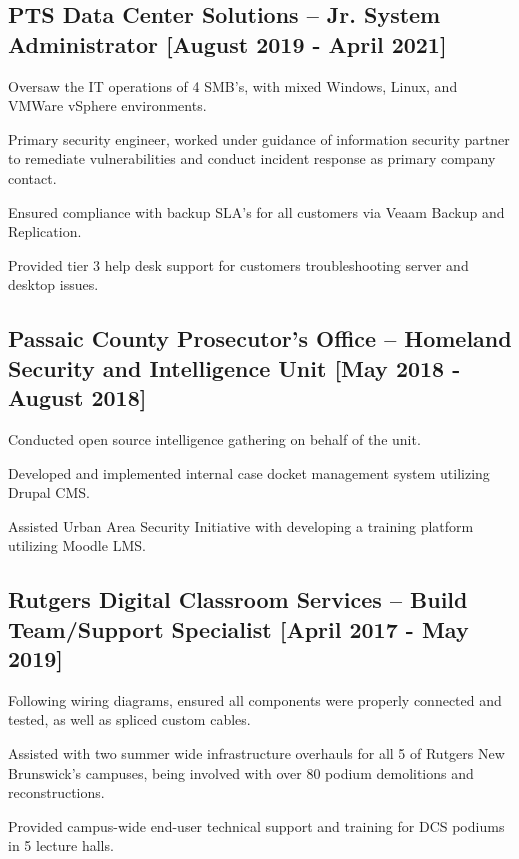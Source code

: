 \documentclass{article}
\begin{document}
\begin{samepage}
\subsection{PTS Data Center Solutions -- Jr. System Administrator [August 2019 - April 2021]}
\begin{compactitem}
	\item Oversaw the IT operations of 4 SMB's, with mixed Windows, Linux, and VMWare vSphere environments.
	\item Primary security engineer, worked under guidance of information security partner to remediate vulnerabilities and conduct incident response as primary company contact.
	\item Ensured compliance with backup SLA's for all customers via Veaam Backup and Replication.
	\item Provided tier 3 help desk support for customers troubleshooting server and desktop issues.
\end{compactitem}
\subsection{Passaic County Prosecutor's Office -- Homeland Security and Intelligence Unit [May 2018 - August 2018]}
\begin{compactitem}
	\item Conducted open source intelligence gathering on behalf of the unit.
	\item Developed and implemented internal case docket management system utilizing Drupal CMS.
	\item Assisted Urban Area Security Initiative with developing a training platform utilizing Moodle LMS.
\end{compactitem}
\subsection{Rutgers Digital Classroom Services -- Build Team/Support Specialist [April 2017 - May 2019]}
\begin{compactitem}
	\item Following wiring diagrams, ensured all components were properly connected and tested, as well as spliced custom cables.
	\item Assisted with two summer wide infrastructure overhauls for all 5 of Rutgers New Brunswick's campuses, being involved with over 80 podium demolitions and reconstructions.
	\item Provided campus-wide end-user technical support and training for DCS podiums in 5 lecture halls.
\end{compactitem}


\end{samepage}
\end{document}
